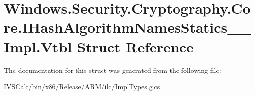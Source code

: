 \hypertarget{struct_windows_1_1_security_1_1_cryptography_1_1_core_1_1_i_hash_algorithm_names_statics_____impl_1_1_vtbl}{}\section{Windows.\+Security.\+Cryptography.\+Core.\+I\+Hash\+Algorithm\+Names\+Statics\+\_\+\+\_\+\+Impl.\+Vtbl Struct Reference}
\label{struct_windows_1_1_security_1_1_cryptography_1_1_core_1_1_i_hash_algorithm_names_statics_____impl_1_1_vtbl}


The documentation for this struct was generated from the following file\+:\begin{DoxyCompactItemize}
\item 
I\+V\+S\+Calc/bin/x86/\+Release/\+A\+R\+M/ilc/Impl\+Types.\+g.\+cs\end{DoxyCompactItemize}
